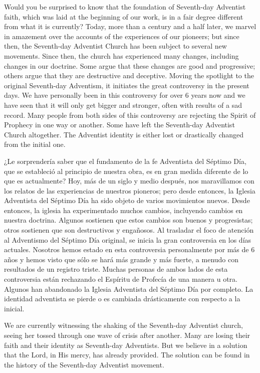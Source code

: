 Would you be surprised to know that the foundation of Seventh-day Adventist faith, which was laid at the beginning of our work, is in a fair degree different from what it is currently? Today, more than a century and a half later, we marvel in amazement over the accounts of the experiences of our pioneers; but since then, the Seventh-day Adventist Church has been subject to several new movements. Since then, the church has experienced many changes, including changes in our doctrine. Some argue that these changes are good and progressive; others argue that they are destructive and deceptive. Moving the spotlight to the original Seventh-day Adventism, it initiates the great controversy in the present days. We have personally been in this controversy for over 6 years now and we have seen that it will only get bigger and stronger, often with results of a sad record. Many people from both sides of this controversy are rejecting the Spirit of Prophecy in one way or another. Some have left the Seventh-day Adventist Church altogether. The Adventist identity is either lost or drastically changed from the initial one.


¿Le sorprendería saber que el fundamento de la fe Adventista del Séptimo Día, que se estableció al principio de nuestra obra, es en gran medida diferente de lo que es actualmente? Hoy, más de un siglo y medio después, nos maravillamos con los relatos de las experiencias de nuestros pioneros; pero desde entonces, la Iglesia Adventista del Séptimo Día ha sido objeto de varios movimientos nuevos. Desde entonces, la iglesia ha experimentado muchos cambios, incluyendo cambios en nuestra doctrina. Algunos sostienen que estos cambios son buenos y progresistas; otros sostienen que son destructivos y engañosos. Al trasladar el foco de atención al Adventismo del Séptimo Día original, se inicia la gran controversia en los días actuales. Nosotros hemos estado en esta controversia personalmente por más de 6 años y hemos visto que sólo se hará más grande y más fuerte, a menudo con resultados de un registro triste. Muchas personas de ambos lados de esta controversia están rechazando el Espíritu de Profecía de una manera u otra. Algunos han abandonado la Iglesia Adventista del Séptimo Día por completo. La identidad adventista se pierde o es cambiada drásticamente con respecto a la inicial.


We are currently witnessing the shaking of the Seventh-day Adventist church, seeing her tossed through one wave of crisis after another. Many are losing their faith and their identity as Seventh-day Adventists. But we believe in a solution that the Lord, in His mercy, has already provided. The solution can be found in the history of the Seventh-day Adventist movement.


